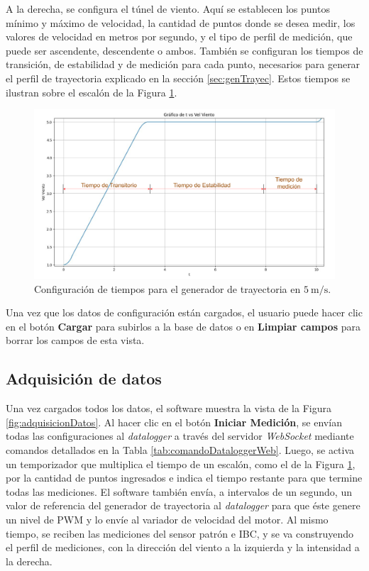 A la derecha, se configura el túnel de viento. Aquí se establecen los puntos mínimo y máximo de velocidad, la cantidad de puntos donde se desea medir, los valores de velocidad en metros por segundo, y el tipo de perfil de medición, que puede ser ascendente, descendente o ambos. También se configuran los tiempos de transición, de estabilidad y de medición para cada punto, necesarios para generar el perfil de trayectoria explicado en la sección \ref{sec:genTrayec}. Estos tiempos se ilustran sobre el escalón de la Figura \ref{fig:curvaEscalon}.

\begin{figure}[H]
    \centering
    \includegraphics[width=0.9\linewidth]{Figuras/AplicacionWeb/frontend/curvaEscalon.png}
    \caption{Configuración de tiempos para el generador de trayectoria en $\SI{5}{\meter\per\second}$.}
    \label{fig:curvaEscalon}
\end{figure}

Una vez que los datos de configuración están cargados, el usuario puede hacer clic en el botón \textbf{Cargar} para subirlos a la base de datos o en \textbf{Limpiar campos} para borrar los campos de esta vista.


\subsection{Adquisición de datos}\label{sec:adquisicionDatos}

Una vez cargados todos los datos, el software muestra la vista de la Figura \ref{fig:adquisicionDatos}. Al hacer clic en el botón \textbf{Iniciar Medición}, se envían todas las configuraciones al \textit{datalogger} a través del servidor \textit{WebSocket} mediante comandos detallados en la Tabla \ref{tab:comandoDataloggerWeb}. Luego, se activa un temporizador que multiplica el tiempo de un escalón, como el de la Figura \ref{fig:curvaEscalon}, por la cantidad de puntos ingresados e indica el tiempo restante para que termine todas las mediciones. El software también envía, a intervalos de un segundo, un valor de referencia del generador de trayectoria al \textit{datalogger} para que éste genere un nivel de PWM y lo envíe al variador de velocidad del motor. Al mismo tiempo, se reciben las mediciones del sensor patrón e IBC, y se va construyendo el perfil de mediciones, con la dirección del viento a la izquierda y la intensidad a la derecha.

